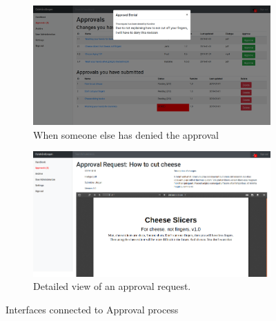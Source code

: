 \begin{figure}[H]\ContinuedFloat
	\centering
	\begin{subfigure}[b]{0.48\textwidth}
		\includegraphics[width=\textwidth]{billeder/iteration1Prototyper/ApprovalDenied.png}
		\caption{When someone else has denied the approval}
		\label{fig:3-ApproveDenied}
	\end{subfigure}
	\quad
	\begin{subfigure}[b]{0.48\textwidth}
		\includegraphics[width=\textwidth]{billeder/iteration1Prototyper/ApprovalRequest.png}
		\caption{Detailed view of an approval request.}
		\label{fig:3-ApproveRequest}
	\end{subfigure}
	\caption{Interfaces connected to Approval process}\label{fig:3-AprovalPages}
\end{figure}

